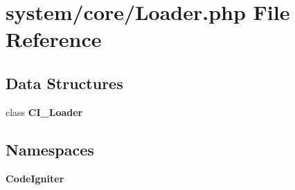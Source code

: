 \section{system/core/\-Loader.php File Reference}
\label{_loader_8php}
\subsection*{Data Structures}
\begin{DoxyCompactItemize}
\item 
class {\bf C\-I\-\_\-\-Loader}
\end{DoxyCompactItemize}
\subsection*{Namespaces}
\begin{DoxyCompactItemize}
\item 
{\bf Code\-Igniter}
\end{DoxyCompactItemize}
